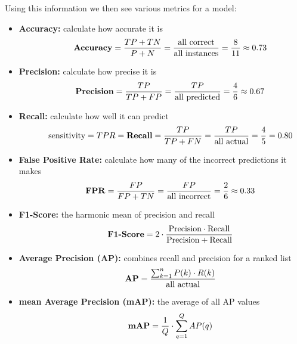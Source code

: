 Using this information we then see various metrics for a model:
\begin{itemize}
    \item \textbf{Accuracy:} calculate how accurate it is
    \begin{equation} \tag*{}
        \text{\textbf{Accuracy}} = \frac{TP + TN}{P + N} = \frac{\text{all correct}}{\text{all instances}} = \frac{8}{11} \approx 0.73
    \end{equation}
    \item \textbf{Precision:} calculate how precise it is
    \begin{equation} \tag*{}
        \text{\textbf{Precision}} = \frac{TP}{TP + FP} = \frac{TP}{\text{all predicted}} = \frac{4}{6} \approx 0.67
    \end{equation}
    \item \textbf{Recall:} calculate how well it can predict
    \begin{equation} \tag*{}
        \text{sensitivity} = TPR = \text{\textbf{Recall}} = \frac{TP}{TP + FN} = \frac{TP}{\text{all actual}} = \frac{4}{5} = 0.80
    \end{equation}
    \item \textbf{False Positive Rate:} calculate how many of the incorrect predictions it makes
    \begin{equation} \tag*{}
        \text{\textbf{FPR}} = \frac{FP}{FP + TN} = \frac{FP}{\text{all incorrect}} = \frac{2}{6} \approx 0.33
    \end{equation}
    \item \textbf{F1-Score:} the harmonic mean of precision and recall
    \begin{equation} \tag*{}
        \text{\textbf{F1-Score}} = 2 \cdot \frac{\text{Precision} \cdot \text{Recall}}{\text{Precision} + \text{Recall}}
    \end{equation}
    \item \textbf{Average Precision (AP):} combines recall and precision for a ranked list
    \begin{equation} \tag*{}
        \text{\textbf{AP}} = \frac{\sum^n_{k=1} P(k) \cdot R(k)}{\text{all actual}}
    \end{equation}
    \item \textbf{mean Average Precision (mAP):} the average of all AP values
    \begin{equation} \tag*{}
        \text{\textbf{mAP}} = \frac{1}{Q} \cdot \sum^Q_{q=1} AP(q)
    \end{equation}
\end{itemize}






\newpage